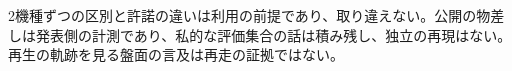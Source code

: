 \begin{claimboundary}[資料と評価の境界]
2機種ずつの区別と許諾の違いは利用の前提であり、取り違えない。公開の物差しは発表側の計測であり、私的な評価集合の話は積み残し、独立の再現はない。再生の軌跡を見る盤面の言及は再走の証拠ではない。
\end{claimboundary}
